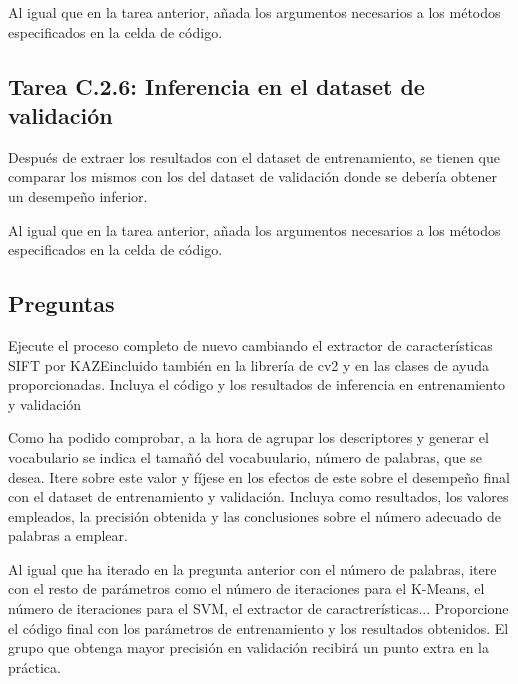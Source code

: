 Al igual que en la tarea anterior, añada los argumentos necesarios a los métodos especificados en la celda de código.

\subsection*{Tarea C.2.6: Inferencia en el dataset de validación}

Después de extraer los resultados con el dataset de entrenamiento, se tienen que comparar los mismos con los del dataset de validación donde se debería obtener un desempeño inferior.

Al igual que en la tarea anterior, añada los argumentos necesarios a los métodos especificados en la celda de código.


\subsection*{Preguntas}

\vspace{5mm}
\begin{tcolorbox}[colback=gray!10, colframe=gray!30, coltitle=black, title=Pregunta C.2: Cambio de SIFT por KAZE, halign=left]
Ejecute el proceso completo de nuevo cambiando el extractor de características SIFT por KAZEincluido también en la librería de cv2 y en las clases de ayuda proporcionadas. Incluya el código y los resultados de inferencia en entrenamiento y validación
\end{tcolorbox}

\vspace{5mm}
\begin{tcolorbox}[colback=gray!10, colframe=gray!30, coltitle=black, title=Pregunta C.3: Cuantas palabras uso?, halign=left]
Como ha podido comprobar, a la hora de agrupar los descriptores y generar el vocabulario se indica el tamañó del vocabuulario, número de palabras, que se desea. Itere sobre este valor y fíjese en los efectos de este sobre el desempeño final con el dataset de entrenamiento y validación. Incluya como resultados, los valores empleados, la precisión obtenida y las conclusiones sobre el número adecuado de palabras a emplear.
\end{tcolorbox}
\vspace{5mm}

\begin{tcolorbox}[colback=gray!10, colframe=gray!30, coltitle=black, title=\textbf{EXTRA} - Pregunta C.4: En busca de los mejores parámetros, halign=left]
Al igual que ha iterado en la pregunta anterior con el número de palabras, itere con el resto de parámetros como el número de iteraciones para el K-Means, el número de iteraciones para el SVM, el extractor de caractrerísticas... Proporcione el código final con los parámetros de entrenamiento y los resultados obtenidos. El grupo que obtenga mayor precisión en validación recibirá un punto extra en la práctica.
\end{tcolorbox}
